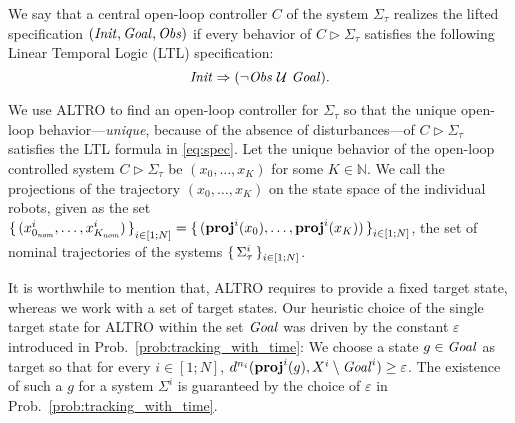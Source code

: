 We say that a central open-loop controller $C$ of the system $\Sigma_\tau$ realizes the lifted specification $(\mathit{Init},\mathit{Goal},\mathit{Obs})$ if every behavior of $C\triangleright \Sigma_\tau$ satisfies the following Linear Temporal Logic (LTL) specification:
\begin{equation}\label{eq:spec}
	\mathit{Init} \Rightarrow (\lnot \mathit{Obs} \ \mathcal{U}\ \mathit{Goal}).
\end{equation} 

We use ALTRO to find an open-loop controller for $\Sigma_\tau$ so that the unique open-loop behavior---\emph{unique}, because of the absence of disturbances---of $C \triangleright\Sigma_\tau$ satisfies the LTL formula in \eqref{eq:spec}.
Let the unique behavior of the  open-loop controlled system $C \triangleright\Sigma_\tau$ be $(x_0,\ldots,x_K)$ for some $K\in \mathbb{N}$.
We call the projections of the trajectory $(x_0,\ldots,x_K)$ on the state space of the individual robots, given as the set $\set{(x_{0_{\mathit{nom}}}^i,\ldots,x_{K_{\mathit{nom}}}^i)}_{i\in [1;N]}=\set{(\mathbf{proj}^i(x_0),\ldots,\mathbf{proj}^i(x_K))}_{i\in [1;N]}$, the set of nominal trajectories of the systems $\set{\Sigma^i_\tau}_{i\in [1;N]}$.

It is worthwhile to mention that, ALTRO requires to provide a fixed target state, whereas we work with a set of target states.
Our heuristic choice of the single target state for ALTRO within the set $\mathit{Goal}$ was driven by the constant $\varepsilon$ introduced in Prob.~\ref{prob:tracking_with_time}:
We choose a state $g\in \mathit{Goal}$ as target so that for every $i\in [1;N]$, $d^{n_i}(\mathbf{proj}^i(g), X^i\setminus \mathit{Goal}^i) \geq \varepsilon$.
The existence of such a $g$ for a system $\Sigma^i$ is guaranteed by the choice of $\varepsilon$ in Prob.~\ref{prob:tracking_with_time}.

%
%	

